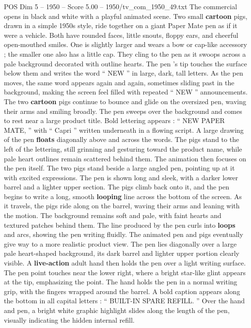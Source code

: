 \begin{textsample}{POS Dim 5 – 1950 – Score 5.00 – 1950/tv\_com\_1950\_49.txt}  \label{ex:f5_pos_080}
The commercial opens in black and white with a playful animated scene.
Two small \textbf{cartoon} pigs, drawn in a simple 1950s style, ride together on a giant Paper Mate pen as if it were a vehicle.
Both have rounded faces, little snouts, floppy ears, and cheerful open-mouthed smiles.
One is slightly larger and wears a bow or cap-like accessory ; the smaller one also has a little cap.
They cling to the pen as it swoops across a pale background decorated with outline hearts.
The pen ’s tip touches the surface below them and writes the word “ NEW ” in large, dark, tall letters.
As the pen moves, the same word appears again and again, sometimes sliding past in the background, making the screen feel filled with repeated “ NEW ” announcements.
The two \textbf{cartoon} pigs continue to bounce and glide on the oversized pen, waving their arms and smiling broadly.
The pen sweeps over the background and comes to rest near a large product title.
Bold lettering appears : “ NEW PAPER MATE, ” with “ Capri ” written underneath in a flowing script.
A large drawing of the pen \textbf{floats} diagonally above and across the words.
The pigs stand to the left of the lettering, still grinning and gesturing toward the product name, while pale heart outlines remain scattered behind them.
The animation then focuses on the pen itself.
The two pigs stand beside a large angled pen, pointing up at it with excited expressions.
The pen is shown long and sleek, with a darker lower barrel and a lighter upper section.
The pigs climb back onto it, and the pen begins to write a long, smooth \textbf{looping} line across the bottom of the screen.
As it travels, the pigs ride along on the barrel, waving their arms and leaning with the motion.
The background remains soft and pale, with faint hearts and textured patches behind them.
The line produced by the pen curls into \textbf{loops} and arcs, showing the pen writing fluidly.
The animated pen and pigs eventually give way to a more realistic product view.
The pen lies diagonally over a large pale heart-shaped background, its dark barrel and lighter upper portion clearly visible.
A \textbf{live-action} adult hand then holds the pen over a light writing surface.
The pen point touches near the lower right, where a bright star-like glint appears at the tip, emphasizing the point.
The hand holds the pen in a normal writing grip, with the fingers wrapped around the barrel.
A bold caption appears along the bottom in all capital letters : “ BUILT-IN SPARE REFILL. ” Over the hand and pen, a bright white graphic highlight slides along the length of the pen, visually indicating the hidden internal refill.

\end{textsample}
